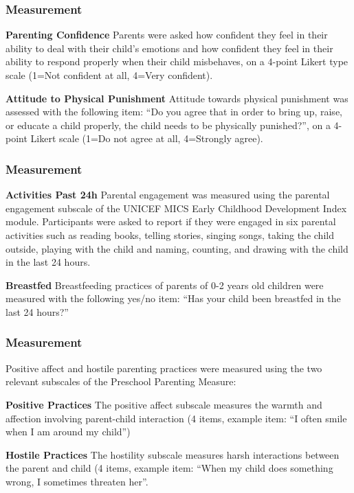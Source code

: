 \documentclass[aspectratio=169]{beamer}
\begin{document}
\begin{frame}
  \frametitle{Measurement}

\textbf{Parenting Confidence}
Parents were asked how confident they feel in their ability to deal with their child’s emotions and how confident they feel in their ability to respond properly when their child misbehaves, on a 4-point Likert type scale (1=Not confident at all, 4=Very confident).

\textbf{Attitude to Physical Punishment}
Attitude towards physical punishment was assessed with the following item: “Do you agree that in order to bring up, raise, or educate a child properly, the child needs to be physically punished?”, on a 4-point Likert scale (1=Do not agree at all, 4=Strongly agree).


\end{frame}


\begin{frame}
  \frametitle{Measurement}

\textbf{Activities Past 24h}
Parental engagement was measured using the parental engagement subscale of the UNICEF MICS Early Childhood Development Index module. Participants were asked to report if they were engaged in six parental activities such as reading books, telling stories, singing songs, taking the child outside, playing with the child and naming, counting, and drawing with the child in the last 24 hours.

\textbf{Breastfed}
Breastfeeding practices of parents of 0-2 years old children were measured with the following yes/no item: “Has your child been breastfed in the last 24 hours?”

\end{frame}


\begin{frame}
  \frametitle{Measurement}

Positive affect and hostile parenting practices were measured using the two relevant subscales of the Preschool Parenting Measure:

\textbf{Positive Practices}
The positive affect subscale measures the warmth and affection involving parent-child interaction (4 items, example item: “I often smile when I am around my child”)

\textbf{Hostile Practices}
The hostility subscale measures harsh interactions between the parent and child (4 items, example item: “When my child does something wrong, I sometimes threaten her”.


\end{frame}
\end{document}
